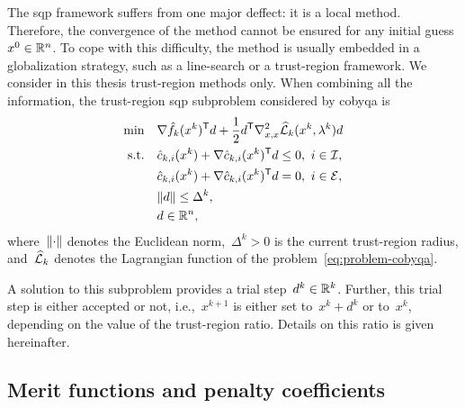 The \gls{sqp} framework suffers from one major deffect: it is a local method.
Therefore, the convergence of the method cannot be ensured for any initial guess~$x^0 \in \mathbb{R}^n$.
To cope with this difficulty, the method is usually embedded in a globalization strategy, such as a line-search or a trust-region framework.
We consider in this thesis trust-region methods only.
When combining all the information, the trust-region \gls{sqp} subproblem considered by \gls{cobyqa} is
\begin{subequations}
    \begin{align}
        \min        & \quad \nabla \objm[k](x^k)^{\T} d + \frac{1}{2} d^{\T} \nabla_{x, x}^2 \lagm[k](x^k, \lambda^k) d \label{derivative-free-trust-region-sqp-subproblem-obj}\\
        \text{s.t.} & \quad \conm[k]{i}(x^k) + \nabla \conm[k]{i}(x^k)^{\T} d \le 0, ~ i \in \iub,\\
                    & \quad \conm[k]{i}(x^k) + \nabla \conm[k]{i}(x^k)^{\T} d = 0, ~ i \in \ieq,\\
                    & \quad \norm{d} \le \Delta^k,\\
                    & \quad d \in \R^n,
    \end{align}
\end{subequations}
where~$\lVert\cdot\rVert$ denotes the Euclidean norm,~$\Delta^k > 0$ is the current trust-region radius, and~$\lagm[k]$ denotes the Lagrangian function of the problem~\cref{eq:problem-cobyqa}.

A solution to this subproblem provides a trial step~$d^k \in \mathbb{R}^k$.
Further, this trial step is either accepted or not, i.e.,~$x^{k + 1}$ is either set to~$x^k + d^k$ or to~$x^k$, depending on the value of the trust-region ratio.
Details on this ratio is given hereinafter.

\subsection{Merit functions and penalty coefficients}

